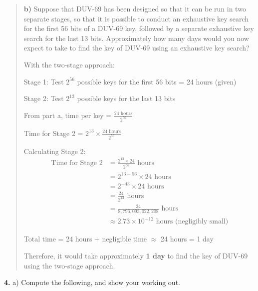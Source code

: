 \documentclass[12pt]{article}
\begin{document}
\begin{quote}
\vspace{0.5cm}

\textbf{b)} Suppose that DUV-69 has been designed so that it can be run in two separate stages, so that it is possible to conduct an exhaustive key search for the first 56 bits of a DUV-69 key, followed by a separate exhaustive key search for the last 13 bits. Approximately how many days would you now expect to take to find the key of DUV-69 using an exhaustive key search?

\vspace{0.3cm}

With the two-stage approach:

Stage 1: Test $2^{56}$ possible keys for the first 56 bits = 24 hours (given)

\vspace{0.3cm}

Stage 2: Test $2^{13}$ possible keys for the last 13 bits

From part a, time per key = $\frac{24 \text{ hours}}{2^{56}}$

Time for Stage 2 = $2^{13} \times \frac{24 \text{ hours}}{2^{56}}$

\vspace{0.3cm}

Calculating Stage 2:
\begin{align*}
\text{Time for Stage 2} &= \frac{2^{13} \times 24}{2^{56}} \text{ hours}\\
&= 2^{13-56} \times 24 \text{ hours}\\
&= 2^{-43} \times 24 \text{ hours}\\
&= \frac{24}{2^{43}} \text{ hours}\\
&= \frac{24}{8,796,093,022,208} \text{ hours}\\
&\approx 2.73 \times 10^{-12} \text{ hours (negligibly small)}
\end{align*}

Total time = 24 hours + negligible time $\approx$ 24 hours = 1 day

Therefore, it would take approximately \textbf{1 day} to find the key of DUV-69 using the two-stage approach.

\end{quote}


\noindent\textbf{4.} a) Compute the following, and show your working out.

\vspace{0.5cm}
\end{document}
